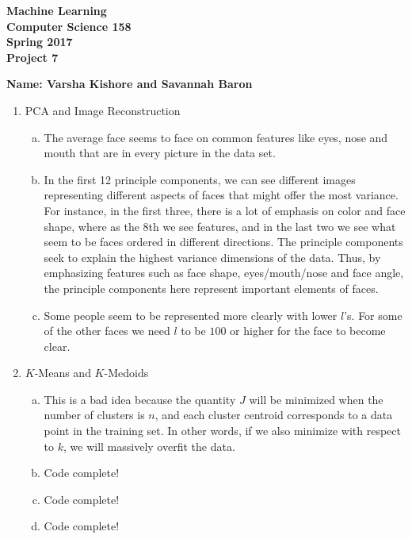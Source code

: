 \documentclass[11pt]{article}
\begin{document}
\newcommand{\Name}[1]{\noindent \textbf{Name:} #1 \\}
\newcommand{\pderiv}[2]{\frac{\partial #1}{\partial #2}}
\newcommand{\psderiv}[3]{\frac{\partial^2 #1}{\partial #2 \partial #3}}

\begin{center}
	\bf
	Machine Learning \\
	Computer Science 158 \\
	Spring 2017 \\
	\rm
	Project 7\\
\end{center}
\noindent \textbf{Name: Varsha Kishore and Savannah Baron} \\

\begin{enumerate}[1]
\item PCA and Image Reconstruction
\begin{enumerate}[(a)]
\item The average face seems to face on common features like eyes, nose and mouth that are in every picture in the data set. 
\item In the first 12 principle components, we can see different images representing different aspects of faces that might offer the most variance. For instance, in the first three, there is a lot of emphasis on color and face shape, where as the 8th we see features, and in the last two we see what seem to be faces ordered in different directions.  The principle components seek to explain the highest variance dimensions of the data. Thus, by emphasizing features such as face shape, eyes/mouth/nose and face angle, the principle components here represent important elements of faces.
\item Some people seem to be represented more clearly with lower $l$'s. For some of the other faces we need $l$ to be $100$ or higher for the face to become clear. 
\end{enumerate}
\item $K$-Means and $K$-Medoids
\begin{enumerate}[(a)]
\item This is a bad idea because the quantity $J$ will be minimized when the number of clusters
is $n$, and each cluster centroid corresponds to a data point in the training set. In other words, if we
also minimize with respect to $k$, we will massively overfit the data. 
\item Code complete!
\item Code complete!
\item Code complete!

\end{enumerate}
\end{enumerate}
\end{document}
